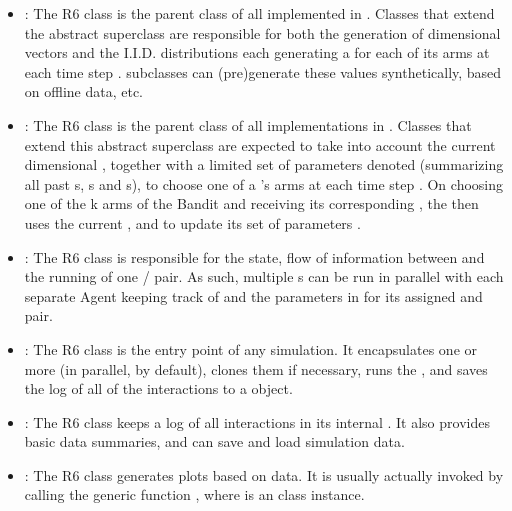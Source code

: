 \documentclass[nojss]{jss}\usepackage[]{graphicx}\usepackage[]{color}
\begin{document}
\begin{itemize}
         \item {}: The R6 class  is the parent class of all  implemented in . Classes that extend the abstract superclass  are responsible for both the generation of  dimensional  vectors  and the  I.I.D. distributions each generating a  for each of its  arms at each time step .  subclasses can (pre)generate these values synthetically, based on offline data, etc.

         \item {}: The R6 class  is the parent class of all  implementations in . Classes that extend this abstract  superclass are expected to take into account the current  dimensional , together with a limited set of parameters denoted  (summarizing all past s, s and s\footnotemark), to choose one of a 's arms at each time step . On choosing one of the {k} arms of the Bandit and receiving its corresponding , the  then uses the current ,  and  to update its set of parameters .

         \item {}: The R6 class  is responsible for the state, flow of information between and the running of one / pair. As such, multiple s can be run in parallel with each separate Agent keeping track of  and the parameters in  for its assigned  and  pair.

         \item {}: The R6 class  is the entry point of any  simulation. It encapsulates one or more  (in parallel, by default), clones them if necessary, runs the , and saves the log of all of the  interactions to a  object.

         \item {}: The R6 class  keeps a log of all  interactions in its internal . It also provides basic data summaries, and can save and load simulation data.

         \item {}: The R6 class  generates plots based on  data. It is usually actually invoked by calling the generic function , where  is an  class instance.
\end{itemize}
\end{document}
